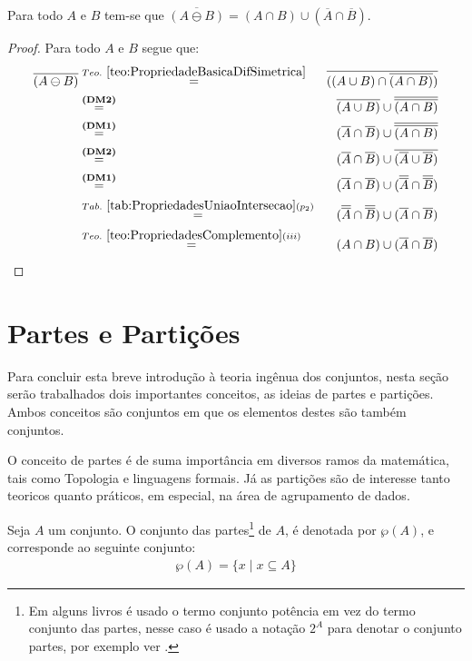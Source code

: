 \begin{teorema}
	Para todo $A$ e $B$ tem-se que $\overline{(A \ominus B)} = (A \cap B) \cup (\overline{A} \cap \overline{B})$.
\end{teorema}

\begin{proof}
	Para todo $A$ e $B$ segue que:
	\begin{eqnarray*}
		\overline{(A \ominus B)} & \stackrel{Teo. \ \ref{teo:PropriedadeBasicaDifSimetrica}}{=} & \overline{((A \cup B) \cap \overline{(A \cap B)})}\\
		& \stackrel{\textbf{(DM2)}}{=}& \overline{(A \cup B)} \cup \overline{\overline{(A \cap B)}}\\
		& \stackrel{\textbf{(DM1)}}{=}& (\overline{A} \cap \overline{B}) \cup \overline{\overline{(A \cap B)}}\\
		& \stackrel{\textbf{(DM2)}}{=}& (\overline{A} \cap \overline{B}) \cup \overline{(\overline{A} \cup \overline{B})}\\
		& \stackrel{\textbf{(DM1)}}{=}& (\overline{A} \cap \overline{B}) \cup (\overline{\overline{A}} \cap \overline{\overline{B}})\\
		& \stackrel{Tab. \ \ref{tab:PropriedadesUniaoIntersecao}(p_2)}{=}& (\overline{\overline{A}} \cap \overline{\overline{B}}) \cup (\overline{A} \cap \overline{B})\\
		& \stackrel{Teo. \ \ref{teo:PropriedadesComplemento}(iii)}{=}& (A \cap B) \cup (\overline{A} \cap \overline{B})
	\end{eqnarray*}
\end{proof}

\section{Partes e Partições}\label{sec:PartesParticoes}

Para concluir esta breve introdução à teoria ingênua dos conjuntos, nesta seção serão trabalhados dois importantes conceitos, as ideias de partes e partições. Ambos conceitos são conjuntos em que os elementos destes são também conjuntos. 

O conceito de partes é de suma importância em diversos ramos da matemática, tais como Topologia\cite{lipschutz1971-Topo} e linguagens formais\cite{linz2006, benjaLivro2010}. Já as partições são de interesse tanto teoricos\cite{carmo2013,halmos2001} quanto práticos, em especial, na área de agrupamento de dados\cite{celebi2014, fern2004}.

\begin{definicao}\label{def:ConjuntoDasPartes}
	Seja $A$ um conjunto. O conjunto das partes\footnote{Em alguns livros é usado o termo conjunto potência em vez do termo conjunto das partes, nesse caso é usado a notação $2^A$ para denotar o conjunto partes, por exemplo ver \cite{lipschutz2013-MD}.} de $A$, é denotada por $\wp(A)$, e corresponde ao seguinte conjunto:
  \begin{eqnarray*}
    \wp(A) = \{x \mid x \subseteq A\}
  \end{eqnarray*}
\end{definicao}

